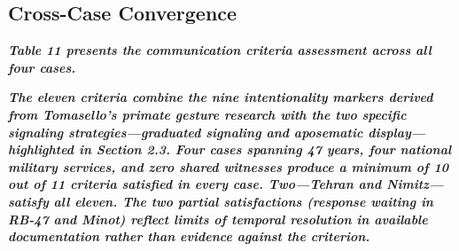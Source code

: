 \documentclass[11pt,letterpaper]{article}
\begin{document}
\subsection{Cross-Case Convergence}

\textbf{\textit{Table 11 presents the communication criteria assessment across all four cases.}}


\begin{table}[H]
\centering
\small
{}
\caption*{\small\textit{Table 11. Cross-case communication criteria convergence.}}
\end{table}


\textbf{\textit{The eleven criteria combine the nine intentionality markers derived from Tomasello's primate gesture research with the two specific signaling strategies---graduated signaling and aposematic display---highlighted in Section 2.3. Four cases spanning 47 years, four national military services, and zero shared witnesses produce a minimum of 10 out of 11 criteria satisfied in every case. Two---Tehran and Nimitz---satisfy all eleven. The two partial satisfactions (response waiting in RB-47 and Minot) reflect limits of temporal resolution in available documentation rather than evidence against the criterion.}}
\end{document}
